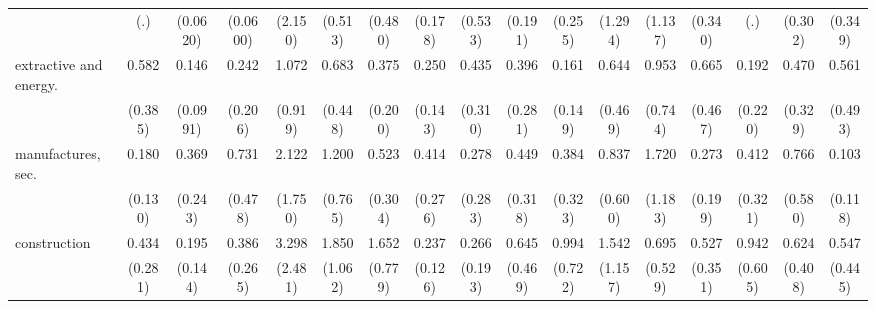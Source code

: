 {\begin{tabular}{l*{16}{c}}
                    &         (.)         &    (0.0620)         &    (0.0600)         &     (2.150)         &     (0.513)         &     (0.480)         &     (0.178)         &     (0.533)         &     (0.191)         &     (0.255)         &     (1.294)         &     (1.137)         &     (0.340)         &         (.)         &     (0.302)         &     (0.349)         \\
[1em]
extractive and energy.&       0.582         &       0.146\sym{**} &       0.242         &       1.072         &       0.683         &       0.375         &       0.250\sym{*}  &       0.435         &       0.396         &       0.161\sym{*}  &       0.644         &       0.953         &       0.665         &       0.192         &       0.470         &       0.561         \\
                    &     (0.385)         &    (0.0991)         &     (0.206)         &     (0.919)         &     (0.448)         &     (0.200)         &     (0.143)         &     (0.310)         &     (0.281)         &     (0.149)         &     (0.469)         &     (0.744)         &     (0.467)         &     (0.220)         &     (0.329)         &     (0.493)         \\
[1em]
manufactures, sec.  &       0.180\sym{*}  &       0.369         &       0.731         &       2.122         &       1.200         &       0.523         &       0.414         &       0.278         &       0.449         &       0.384         &       0.837         &       1.720         &       0.273         &       0.412         &       0.766         &       0.103\sym{*}  \\
                    &     (0.130)         &     (0.243)         &     (0.478)         &     (1.750)         &     (0.765)         &     (0.304)         &     (0.276)         &     (0.283)         &     (0.318)         &     (0.323)         &     (0.600)         &     (1.183)         &     (0.199)         &     (0.321)         &     (0.580)         &     (0.118)         \\
[1em]
construction        &       0.434         &       0.195\sym{*}  &       0.386         &       3.298         &       1.850         &       1.652         &       0.237\sym{**} &       0.266         &       0.645         &       0.994         &       1.542         &       0.695         &       0.527         &       0.942         &       0.624         &       0.547         \\
                    &     (0.281)         &     (0.144)         &     (0.265)         &     (2.481)         &     (1.062)         &     (0.779)         &     (0.126)         &     (0.193)         &     (0.469)         &     (0.722)         &     (1.157)         &     (0.529)         &     (0.351)         &     (0.605)         &     (0.408)         &     (0.445)         \\

\end{tabular}}
